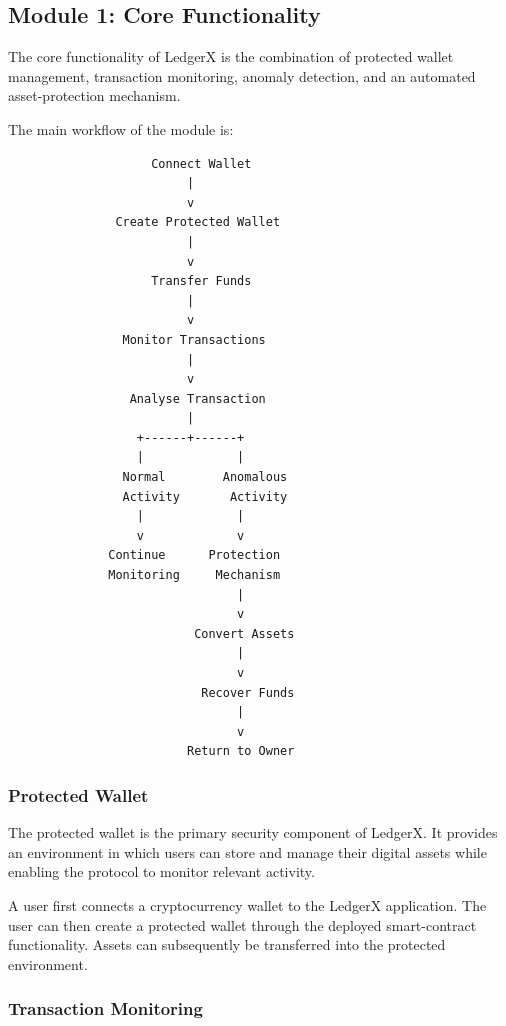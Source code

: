 \documentclass{tietreport}
\begin{document}
\subsection{Module 1: Core Functionality}

The core functionality of LedgerX is the combination of protected
wallet management, transaction monitoring, anomaly detection, and an
automated asset-protection mechanism.

The main workflow of the module is:

\begin{verbatim}
                    Connect Wallet
                         |
                         v
               Create Protected Wallet
                         |
                         v
                    Transfer Funds
                         |
                         v
                Monitor Transactions
                         |
                         v
                 Analyse Transaction
                         |
                  +------+------+
                  |             |
                Normal        Anomalous
                Activity       Activity
                  |             |
                  v             v
              Continue      Protection
              Monitoring     Mechanism
                                |
                                v
                          Convert Assets
                                |
                                v
                           Recover Funds
                                |
                                v
                         Return to Owner
\end{verbatim}

\subsubsection{Protected Wallet}

The protected wallet is the primary security component of LedgerX.
It provides an environment in which users can store and manage their
digital assets while enabling the protocol to monitor relevant
activity.

A user first connects a cryptocurrency wallet to the LedgerX
application. The user can then create a protected wallet through the
deployed smart-contract functionality. Assets can subsequently be
transferred into the protected environment.

\subsubsection{Transaction Monitoring}
\end{document}
